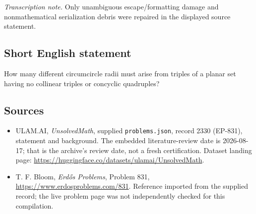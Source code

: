 \documentclass[11pt,a4paper]{article}
\begin{document}
{\small\emph{Transcription note.} Only unambiguous escape/formatting damage and nonmathematical serialization debris were repaired in the displayed source statement.}

\subsection{Short English statement}

How many different circumcircle radii must arise from triples of a planar set having no collinear triples or concyclic quadruples?

\subsection{Sources}

{\small

\begin{itemize}

\item[\hypertarget{source:2330:1}{S1}] ULAM.AI, \emph{UnsolvedMath}, supplied \texttt{problems.json}, record 2330 (EP-831), statement and background. The embedded literature-review date is 2026-08-17; that is the archive’s review date, not a fresh certification. Dataset landing page: \url{https://huggingface.co/datasets/ulamai/UnsolvedMath}.

\item[\hypertarget{source:2330:2}{S2}] T. F. Bloom, \emph{Erdős Problems}, Problem 831, \url{https://www.erdosproblems.com/831}. Reference imported from the supplied record; the live problem page was not independently checked for this compilation.

\end{itemize}

}

\label{end:2330}
\end{document}
